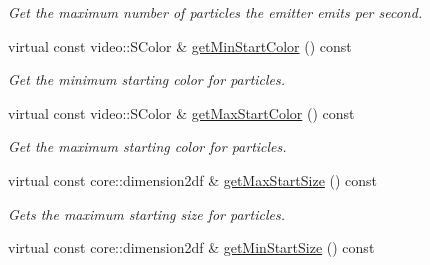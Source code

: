 \begin{DoxyCompactItemize}
\begin{DoxyCompactList}\small\item\em Get the maximum number of particles the emitter emits per second. \end{DoxyCompactList}\item 
\hypertarget{classirr_1_1scene_1_1_c_particle_mesh_emitter_a912a0eb34d4e138fe41b2c5e727bd576}{virtual const video\-::\-S\-Color \& \hyperlink{classirr_1_1scene_1_1_c_particle_mesh_emitter_a912a0eb34d4e138fe41b2c5e727bd576}{get\-Min\-Start\-Color} () const }\label{classirr_1_1scene_1_1_c_particle_mesh_emitter_a912a0eb34d4e138fe41b2c5e727bd576}

\begin{DoxyCompactList}\small\item\em Get the minimum starting color for particles. \end{DoxyCompactList}\item 
\hypertarget{classirr_1_1scene_1_1_c_particle_mesh_emitter_af0992474b0e5bfa6ef22c81027cbb8c1}{virtual const video\-::\-S\-Color \& \hyperlink{classirr_1_1scene_1_1_c_particle_mesh_emitter_af0992474b0e5bfa6ef22c81027cbb8c1}{get\-Max\-Start\-Color} () const }\label{classirr_1_1scene_1_1_c_particle_mesh_emitter_af0992474b0e5bfa6ef22c81027cbb8c1}

\begin{DoxyCompactList}\small\item\em Get the maximum starting color for particles. \end{DoxyCompactList}\item 
\hypertarget{classirr_1_1scene_1_1_c_particle_mesh_emitter_a6f5ccf27130620129f8e3060f2fa0fef}{virtual const core\-::dimension2df \& \hyperlink{classirr_1_1scene_1_1_c_particle_mesh_emitter_a6f5ccf27130620129f8e3060f2fa0fef}{get\-Max\-Start\-Size} () const }\label{classirr_1_1scene_1_1_c_particle_mesh_emitter_a6f5ccf27130620129f8e3060f2fa0fef}

\begin{DoxyCompactList}\small\item\em Gets the maximum starting size for particles. \end{DoxyCompactList}\item 
\hypertarget{classirr_1_1scene_1_1_c_particle_mesh_emitter_aeac06a5b9c4a3e1d4e62cbaa6010a615}{virtual const core\-::dimension2df \& \hyperlink{classirr_1_1scene_1_1_c_particle_mesh_emitter_aeac06a5b9c4a3e1d4e62cbaa6010a615}{get\-Min\-Start\-Size} () const }\label{classirr_1_1scene_1_1_c_particle_mesh_emitter_aeac06a5b9c4a3e1d4e62cbaa6010a615}


\end{DoxyCompactItemize}
